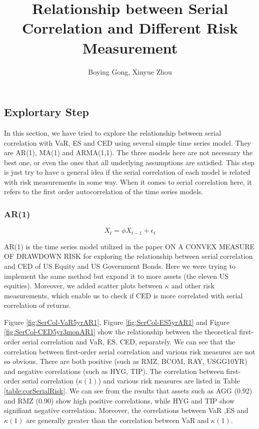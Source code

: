 \documentclass[12pt]{article}
\title{Relationship between Serial Correlation and Different Risk Measurement}
\author{Boying Gong, Xinyue Zhou}
\begin{document}
\maketitle

\fi

\subsection{Explortary Step}
In this section, we have tried to explore the relationship between serial correlation with VaR, ES and CED using several simple time series model. They are AR(1), MA(1) and ARMA(1,1). The three models here are not necessary the best one, or even the ones that all underlying assumptions are satisfied. This step is just try to have a general idea if the serial correlation of each model is related with risk measurements in some way. When it comes to serial correlation here, it refers to the first order autocorrelation of the time series models. 

\subsubsection{AR(1)}

\begin{equation}
X_t = \phi X_{t-1} + \epsilon_t
\end{equation}

AR(1) is the time series model utilized in the paper ON A CONVEX MEASURE OF DRAWDOWN RISK for exploring the relationship between serial correlation and CED of US Equity and US Government Bonds. Here we were trying to implement the same method but expand it to more assets (the eleven US equities). Moreover, we added scatter plots between $\kappa$ and other risk measurements, which enable us to check if CED is more correlated with serial correlation of returns.

Figure \ref{fig:SerCol-VaR5yrAR1}, Figure \ref{fig:SerCol-ES5yrAR1} and Figure \ref{fig:SerCol-CED5yr3monAR1} show the relationship between the theoretical first-order serial correlation and VaR, ES, CED, separately. We can see that the correlation between first-order serial correlation and various risk measures are not so obvious. There are both positive (such as RMZ, BCOM, RAY, USGG10YR) and negative correlations (such as HYG, TIP). The correlation between first-order serial correlation ($\kappa(1)$) and various risk measures are listed in Table \ref{table:corSerialRisk}. We can see from the results that assets such as AGG (0.92) and RMZ (0.90) show high positive correlations, while HYG and TIP show signifiant negative correlation. Moreover, the correlations between VaR ,ES and $\kappa(1)$ are generally greater than the correlation between VaR and $\kappa(1)$.
\end{document}
